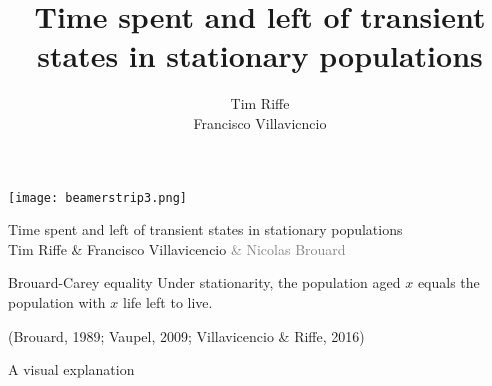 \documentclass[20pt,usenames,dvipsnames]{beamer}
\title{Time spent and left of transient states in
stationary populations}
\subtitle{Tim Riffe \\ Francisco Villavicncio}		%
\begin{document}

\begin{frame}[plain]
	\vspace{-3cm}
 \centerline{\texttt{[image: beamerstrip3.png]}}

	
	\huge
	\vspace{1em}
	
	Time spent and left of transient states in stationary populations\\
	\vspace{1em}
	\large 
	Tim Riffe \& Francisco Villavicencio \textcolor{gray}{\& Nicolas Brouard}
\end{frame}


\begin{frame}[plain]
\Large
 \begin{block}{Brouard-Carey equality}
  Under stationarity, the population aged $x$ equals the population with $x$ life left to live.\\ 
 \end{block}
\small{(Brouard, 1989; Vaupel, 2009; Villavicencio \& Riffe, 2016)}
\end{frame}

\begin{frame}[plain]
\Large
\centering
A visual explanation

\end{frame}
\end{document}
